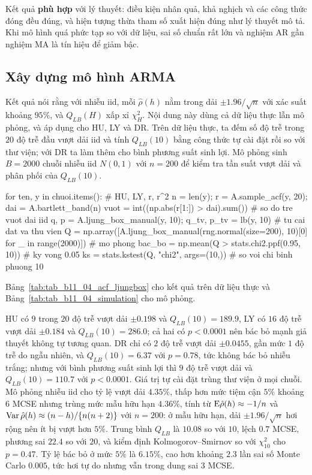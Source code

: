  Kết quả \textbf{phù hợp} với lý thuyết: điều kiện nhân quả, khả nghịch và các công thức đóng đều đúng, và hiện tượng thừa tham số xuất hiện đúng như lý thuyết mô tả. Khi mô hình quá phức tạp so với dữ liệu, sai số chuẩn rất lớn và nghiệm AR gần nghiệm MA là tín hiệu để giảm bậc.

\subsection{Xây dựng mô hình ARMA}

 Kết quả  nói rằng với nhiễu iid, mỗi $\hat\rho(h)$ nằm trong dải $\pm1.96/\sqrt n$ với xác suất khoảng $95\%$, và $Q_{LB}(H)$ xấp xỉ $\chi^2_H$.
 Nội dung này dùng cả dữ liệu thực lẫn mô phỏng, và áp dụng cho HU, LY và DR. Trên dữ liệu thực, ta đếm số độ trễ trong $20$ độ trễ đầu vượt dải iid và tính $Q_{LB}(10)$ bằng công thức tự cài đặt rồi so với thư viện; với DR ta làm thêm cho bình phương suất sinh lợi. Mô phỏng sinh $B=2000$ chuỗi nhiễu iid $N(0,1)$ với $n=200$ để kiểm tra tần suất vượt dải và phân phối của $Q_{LB}(10)$.
\begin{codeblock}
for ten, y in chuoi.items():                 # HU, LY, r, r^2
    n = len(y); r = A.sample_acf(y, 20); dai = A.bartlett_band(n)
    vuot = int((np.abs(r[1:]) > dai).sum())              # so do tre vuot dai iid
    q, p = A.ljung_box_manual(y, 10); q_tv, p_tv = lb(y, 10)   # tu cai dat va thu vien
Q = np.array([A.ljung_box_manual(rng.normal(size=200), 10)[0] for _ in range(2000)])   # mo phong
bac_bo = np.mean(Q > stats.chi2.ppf(0.95, 10))           # ky vong 0.05
ks = stats.kstest(Q, "chi2", args=(10,))                 # so voi chi binh phuong 10
\end{codeblock}
 Bảng~\ref{tab:tab_b11_04_acf_ljungbox} cho kết quả trên dữ liệu thực và Bảng~\ref{tab:tab_b11_04_simulation} cho mô phỏng.


 HU có $9$ trong $20$ độ trễ vượt dải $\pm0.198$ và $Q_{LB}(10)=189.9$, LY có $16$ độ trễ vượt dải $\pm0.184$ và $Q_{LB}(10)=286.0$; cả hai có $p<0.0001$ nên bác bỏ mạnh giả thuyết không tự tương quan. DR chỉ có $2$ độ trễ vượt dải $\pm0.0455$, gần mức $1$ độ trễ do ngẫu nhiên, và $Q_{LB}(10)=6.37$ với $p=0.78$, tức không bác bỏ nhiễu trắng; nhưng với bình phương suất sinh lợi thì $9$ độ trễ vượt dải và $Q_{LB}(10)=110.7$ với $p<0.0001$. Giá trị tự cài đặt trùng thư viện ở mọi chuỗi. Mô phỏng nhiễu iid cho tỷ lệ vượt dải $4.35\%$, thấp hơn mức tiệm cận $5\%$ khoảng $6$ MCSE nhưng trùng mức mẫu hữu hạn $4.36\%$, tính từ $\mathrm{E}\hat\rho(h)\approx-1/n$ và $\operatorname{Var}\hat\rho(h)\approx(n-h)/\{n(n+2)\}$ với $n=200$: ở mẫu hữu hạn, dải $\pm1.96/\sqrt n$ hơi rộng nên ít bị vượt hơn $5\%$. Trung bình $Q_{LB}$ là $10.08$ so với $10$, lệch $0.7$ MCSE, phương sai $22.4$ so với $20$, và kiểm định Kolmogorov--Smirnov so với $\chi^2_{10}$ cho $p=0.47$. Tỷ lệ bác bỏ ở mức $5\%$ là $6.15\%$, cao hơn khoảng $2.3$ lần sai số Monte Carlo $0.005$, tức hơi tự do nhưng vẫn trong dung sai $3$ MCSE.

